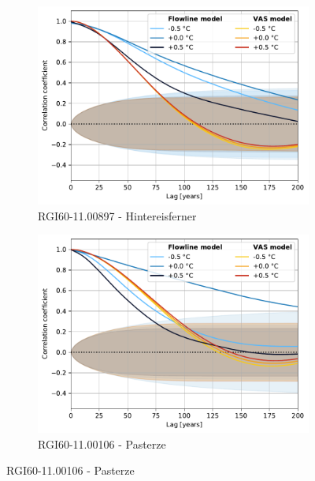       \begin{figure}[htp]
        \centering
        \begin{subfigure}[b]{0.48\textwidth}
          \caption{RGI60-11.00897 - Hintereisferner}
          \label{fig:acf:hintereisferner}
          \centering
          \includegraphics[width=\textwidth]{../plots/final_plots/acf/Hintereisferner.pdf}
        \end{subfigure}
        \hfill
        \begin{subfigure}[b]{0.48\textwidth}
          \caption{RGI60-11.00106 - Pasterze}
          \label{fig:acf:pasterze}
          \centering
          \includegraphics[width=\textwidth]{../plots/final_plots/acf/Pasterze.pdf}
        \end{subfigure}

\end{figure}

